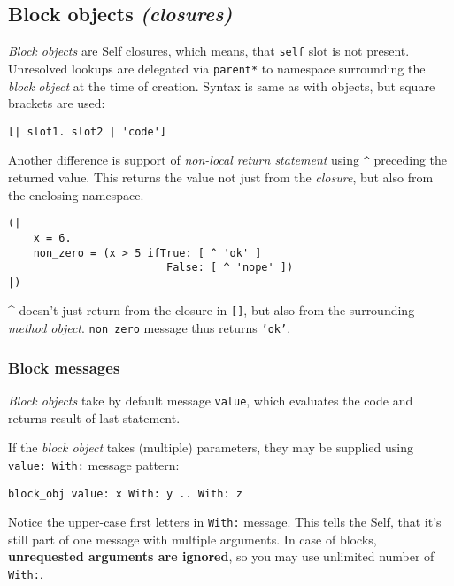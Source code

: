 \documentclass[10pt]{article}
\begin{document}
\begin{multicols*}{3}
\subsection{Block objects \textit{(closures)}}

\textit{Block objects} are Self closures, which means, that \texttt{self} slot is not present. Unresolved lookups are delegated via \texttt{parent*} to namespace surrounding the \textit{block object} at the time of creation. Syntax is same as with objects, but square brackets are used:

\begin{lstlisting}
[| slot1. slot2 | 'code']
\end{lstlisting}


Another difference is support of \textit{non-local return statement} using \texttt{\^} preceding the returned value. This returns the value not just from the \textit{closure}, but also from the enclosing namespace.

\begin{lstlisting}
(|
    x = 6.
    non_zero = (x > 5 ifTrue: [ ^ 'ok' ]
                         False: [ ^ 'nope' ])
|)
\end{lstlisting}

\^{} doesn't just return from the closure in \texttt{[]}, but also from the surrounding \textit{method object}. \texttt{non\_zero} message thus returns \texttt{'ok'}.



\subsubsection{Block messages}

\textit{Block objects} take by default message \texttt{value}, which evaluates the code and returns result of last statement.

If the \textit{block object} takes (multiple) parameters, they may be supplied using \texttt{value:\ With:} message pattern:

\begin{lstlisting}
block_obj value: x With: y .. With: z
\end{lstlisting}

Notice the upper-case first letters in \texttt{With:} message. This tells the Self, that it's still part of one message with multiple arguments. In case of blocks, \textbf{unrequested arguments are ignored}, so you may use unlimited number of \texttt{With:}.





\end{multicols*}
\end{document}
